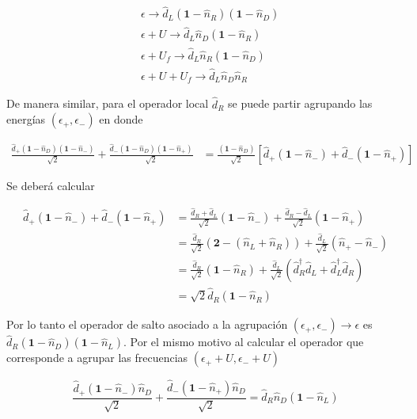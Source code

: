 \begin{appendixs}
\begin{align*}
    &\epsilon \to \hat{d}_{L}(\textbf{1}-\hat{n}_{R})(\textbf{1}-\hat{n}_{D})\\
   &\epsilon + U \to \hat{d}_{L}\hat{n}_{D}(\textbf{1}-\hat{n}_{R})\\
    &\epsilon +U_{f}\to \hat{d}_{L}\hat{n}_{R}(\textbf{1}-\hat{n}_{D})\\
    &\epsilon +U+U_{f}\to \hat{d}_{L}\hat{n}_{D}\hat{n}_{R}
\end{align*}

De manera similar, para el operador local $\hat{d}_{R}$ se puede partir agrupando las energías $(\epsilon_{+},\epsilon_{-})$ en donde

\begin{align*}
    \frac{\hat{d}_{+}(\textbf{1}-\hat{n}_{D})(\textbf{1}-\hat{n}_{-}) }{\sqrt{2}} + \frac{\hat{d}_{-}(\textbf{1}-\hat{n}_{D})(\textbf{1}-\hat{n}_{+}) }{\sqrt{2}} & = \frac{(\textbf{1} - \hat{n}_{D})}{\sqrt{2}}[\hat{d}_{+}(\textbf{1}-\hat{n}_{-}) + \hat{d}_{-}(\textbf{1}-\hat{n}_{+})]
\end{align*}

Se deberá calcular 

\begin{align*}
    \hat{d}_{+}(\textbf{1}-\hat{n}_{-}) + \hat{d}_{-}(\textbf{1}-\hat{n}_{+}) & =  \frac{\hat{d}_{R} + \hat{d}_{L}}{\sqrt{2}}(\textbf{1} - \hat{n}_{-}) + \frac{\hat{d}_{R} - \hat{d}_{L}}{\sqrt{2}}(\textbf{1} - \hat{n}_{+})   \\
    & = \frac{\hat{d}_{R}}{\sqrt{2}}(\textbf{2} - (\hat{n}_{L} + \hat{n}_{R})) + \frac{\hat{d}_{L}}{\sqrt{2}} (\hat{n}_{+}-\hat{n}_{-}) \\
    & = \frac{\hat{d}_{R}}{\sqrt{2}}(\textbf{1} -  \hat{n}_{R}) + \frac{\hat{d}_{L}}{\sqrt{2}} (\hat{d}^{\dagger}_{R}\hat{d}_{L} + \hat{d}^{\dagger}_{L}\hat{d}_{R}) \\
    & = \sqrt{2}\hat{d}_{R}(\textbf{1}-\hat{n}_{R})
\end{align*}

Por lo tanto el operador de salto asociado a la agrupación $(\epsilon_{+},\epsilon_{-})\to \epsilon$ es $\hat{d}_{R}(\textbf{1}-\hat{n}_{D})(\textbf{1}-\hat{n}_{L})$. Por el mismo motivo al calcular el operador que corresponde a agrupar las frecuencias $(\epsilon_{+}+U,\epsilon_{-}+U)$ 

\begin{equation*}
    \frac{\hat{d}_{+}(\textbf{1}-\hat{n}_{-})\hat{n}_{D}}{\sqrt{2}} + \frac{\hat{d}_{-}(\textbf{1}-\hat{n}_{+})\hat{n}_{D}}{\sqrt{2}}  = \hat{d}_{R}\hat{n}_{D}(\textbf{1}-\hat{n}_{L})
\end{equation*}


\end{appendixs}
